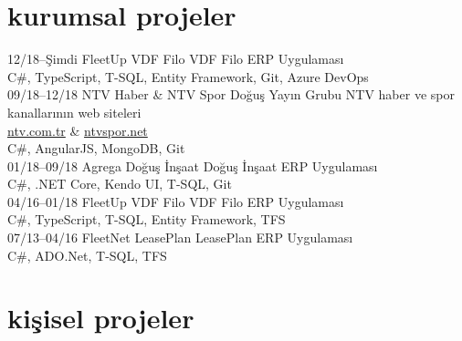 \documentclass[]{friggeri-cv} %
\begin{document}
\section{kurumsal projeler}

\begin{entrylist}

\entry
{12/18--Şimdi}
{FleetUp}
{VDF Filo}
{VDF Filo ERP Uygulaması
\\C\#, TypeScript, T-SQL, Entity Framework, Git, Azure DevOps}
\\
\entry
{09/18--12/18}
{NTV Haber \& NTV Spor}
{Doğuş Yayın Grubu}
{NTV haber ve spor kanallarının web siteleri
\\\href{https://www.ntv.com.tr/}{ntv.com.tr} \& \href{http://www.ntvspor.net/}{ntvspor.net}
\\C\#, AngularJS, MongoDB, Git}
\\
\entry
{01/18--09/18}
{Agrega}
{Doğuş İnşaat}
{Doğuş İnşaat ERP Uygulaması
\\C\#, .NET Core, Kendo UI, T-SQL, Git}
\\
\entry
{04/16--01/18}
{FleetUp}
{VDF Filo}
{VDF Filo ERP Uygulaması
\\C\#, TypeScript, T-SQL, Entity Framework, TFS}
\\
\entry
{07/13--04/16}
{FleetNet}
{LeasePlan}
{LeasePlan ERP Uygulaması
\\C\#, ADO.Net, T-SQL, TFS}

\end{entrylist}

\section{kişisel projeler}
\end{document}
